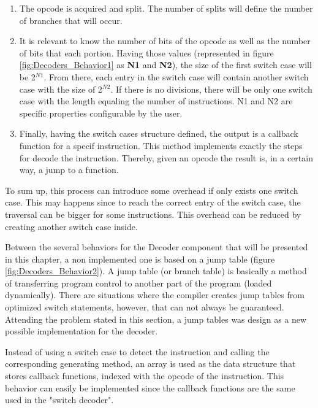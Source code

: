     \begin{enumerate}
    
   		\item The opcode is acquired and split. The number of splits will define the number of branches that will occur.
        
        \item It is relevant to know the number of bits of the opcode as well as the number of bits that each portion. Having those values (represented in figure \ref{fig:Decoders_Behavior1} as \textbf{N1} and \textbf{N2}), the size of the first switch case will be 2$^{N1}$. From there, each entry in the switch case will contain another switch case with the size of 2$^{N2}$. If there is no divisions, there will be only one switch case with the length equaling the number of instructions. N1 and N2 are specific properties configurable by the user.

		\item Finally, having the switch cases structure defined, the output is a callback function for a specif instruction. This method implements exactly the steps for decode the instruction. Thereby, given an opcode the result is, in a certain way, a jump to a function.
	\end{enumerate}
    
    To sum up, this process can introduce some overhead if only exists one switch case. This may happens since to reach the correct entry of the switch case, the traversal can be bigger for some instructions. This overhead can be reduced by creating another switch case inside. 

   

Between the several behaviors for the Decoder component that will be presented in this chapter, a non implemented one is based on a jump table (figure \ref{fig:Decoders_Behavior2}). A jump table (or branch table) is basically a method of transferring program control to another part of the program (loaded dynamically). There are situations where the compiler creates jump tables from optimized switch statements, however, that can not always be guaranteed. Attending the problem stated in this section, a jump tables was design as a new possible implementation for the decoder. 

Instead of using a switch case to detect the instruction and calling the corresponding generating method, an array is used as the data structure that stores callback functions, indexed with the opcode of the instruction. This behavior can easily be implemented since the callback functions are the same used in the "switch decoder". 

